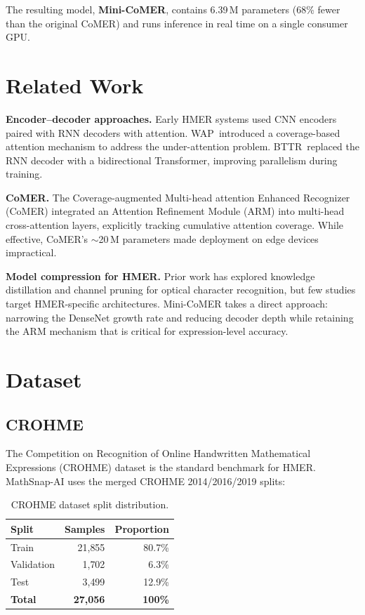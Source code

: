 \documentclass[11pt,a4paper]{article}
\begin{document}
The resulting model, \textbf{Mini-CoMER}, contains 6.39\,M parameters (68\% fewer than the original CoMER) and runs inference in real time on a single consumer GPU.

\section{Related Work}
\label{sec:related}

\textbf{Encoder--decoder approaches.} Early HMER systems used CNN encoders paired with RNN decoders with attention. WAP~introduced a coverage-based attention mechanism to address the under-attention problem. BTTR~replaced the RNN decoder with a bidirectional Transformer, improving parallelism during training.

\textbf{CoMER.} The Coverage-augmented Multi-head attention Enhanced Recognizer (CoMER) integrated an Attention Refinement Module (ARM) into multi-head cross-attention layers, explicitly tracking cumulative attention coverage. While effective, CoMER's ${\sim}$20\,M parameters made deployment on edge devices impractical.

\textbf{Model compression for HMER.} Prior work has explored knowledge distillation and channel pruning for optical character recognition, but few studies target HMER-specific architectures. Mini-CoMER takes a direct approach: narrowing the DenseNet growth rate and reducing decoder depth while retaining the ARM mechanism that is critical for expression-level accuracy.

\section{Dataset}
\label{sec:dataset}

\subsection{CROHME}

The Competition on Recognition of Online Handwritten Mathematical Expressions (CROHME) dataset is the standard benchmark for HMER. MathSnap-AI uses the merged CROHME 2014/2016/2019 splits:

\begin{table}[H]
\centering
\caption{CROHME dataset split distribution.}
\label{tab:dataset}
\begin{tabular}{lrr}
\toprule
\textbf{Split} & \textbf{Samples} & \textbf{Proportion} \\
\midrule
Train      & 21{,}855 & 80.7\% \\
Validation &  1{,}702 &  6.3\% \\
Test       &  3{,}499 & 12.9\% \\
\midrule
\textbf{Total} & \textbf{27{,}056} & \textbf{100\%} \\
\bottomrule
\end{tabular}
\end{table}
\end{document}
